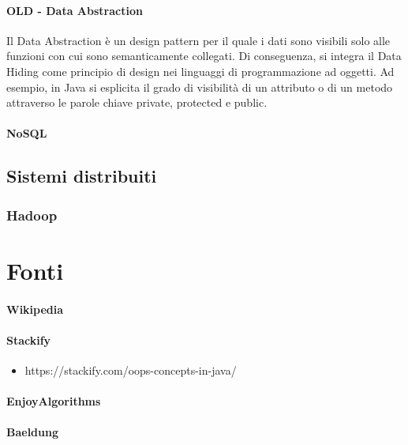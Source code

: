\documentclass{article}
\begin{document}
            \paragraph{OLD - Data Abstraction} Il Data Abstraction è un design pattern per il quale i dati sono visibili solo alle funzioni con cui sono semanticamente collegati. Di conseguenza, si integra il Data Hiding come principio di design nei linguaggi di programmazione ad oggetti. Ad esempio, in Java si esplicita il grado di visibilità di un attributo o di un metodo attraverso le parole chiave private, protected e public.
            \paragraph{NoSQL}
    \subsection{Sistemi distribuiti}
        \subsubsection{Hadoop}
    
    \section{Fonti}
        \paragraph{Wikipedia}
        \paragraph{Stackify}
            \begin{itemize}
                \item https://stackify.com/oops-concepts-in-java/
            \end{itemize} 
        \paragraph{EnjoyAlgorithms}
        \paragraph{Baeldung}
            
            
            
\end{document}
